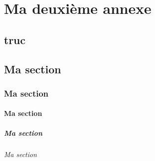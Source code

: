 \documentclass{polytech/polytech}
\begin{document}
\label{ann:chap1:sec}

\chapter{Ma deuxième annexe}
  
\label{ann:chap2}
     
\lipsum[1-4]

\section{truc}

\label{ann:chap2:sec}

\section{Ma section}

\lipsum[1-3]

\subsection{Ma section}

\lipsum[1-3]

\subsubsection{Ma section}

\lipsum[1-3]

\paragraph{Ma section}

\lipsum[1-3]

\subparagraph{Ma section}

\lipsum[1-3]
\end{document}
